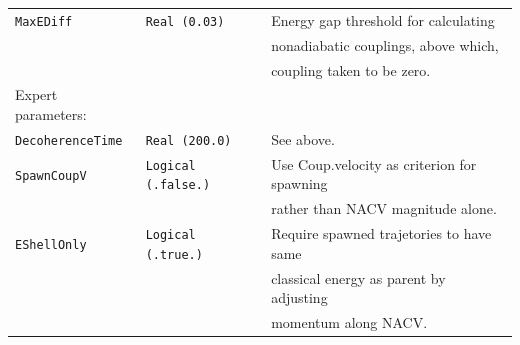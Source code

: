 \documentclass[11pt]{article}
\begin{document}
\begin{table}[h]
\begin{tabular}{ l l l }
{\tt MaxEDiff}       & {\tt Real (0.03)}      & {\small Energy gap threshold for calculating}\\&&
                                                {\small nonadiabatic couplings, above which,}\\&&
                                                {\small coupling taken to be zero.}\\
Expert parameters:\\
{\tt DecoherenceTime}&{\tt Real (200.0)}      & {\small See above.}\\
{\tt SpawnCoupV}     & {\tt Logical (.false.)}& {\small Use Coup.velocity as criterion for spawning}\\&&
                                                {\small rather than NACV magnitude alone.}\\
{\tt EShellOnly}     & {\tt Logical (.true.)} & {\small Require spawned trajetories to have same}\\&&
                                                {\small classical energy as parent by adjusting}\\&&
                                                {\small momentum along NACV.}\\
\hline\hline
\end{tabular}
\end{table}
\end{document}

